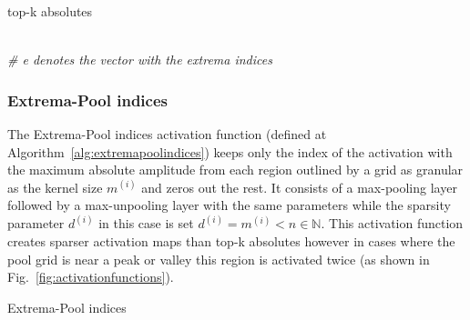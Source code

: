\documentclass[journal]{IEEEtran}
\begin{document}
\begin{algorithm}[H]
	\caption{top-k absolutes}\label{alg:topkabsolutes}
	\begin{algorithmic}[1]
		\renewcommand{\algorithmicrequire}{\textbf{Input:}}
		\renewcommand{\algorithmicensure}{\textbf{Output:}}
		\ENSURE{$\alpha$}
		\\\textit{\scriptsize \# e denotes the vector with the extrema indices}
		\ENDFOR{}
		\RETURN{$\alpha$}
	\end{algorithmic}
\end{algorithm}

\subsubsection{Extrema-Pool indices}\label{sec:extremapoolindices}
The Extrema-Pool indices activation function (defined at Algorithm~\ref{alg:extremapoolindices}) keeps only the index of the activation with the maximum absolute amplitude from each region outlined by a grid as granular as the kernel size $m^{(i)}$ and zeros out the rest.
It consists of a max-pooling layer followed by a max-unpooling layer with the same parameters while the sparsity parameter $d^{(i)}$ in this case is set $d^{(i)} = m^{(i)} < n \in \mathbb{N}$.
This activation function creates sparser activation maps than top-k absolutes however in cases where the pool grid is near a peak or valley this region is activated twice (as shown in Fig.~\ref{fig:activationfunctions}).

\begin{algorithm}[H]
	\caption{Extrema-Pool indices}\label{alg:extremapoolindices}
	\begin{algorithmic}[1]
		\renewcommand{\algorithmicrequire}{\textbf{Input:}}
		\renewcommand{\algorithmicensure}{\textbf{Output:}}
		\ENSURE{$\alpha$}
		\RETURN{$\alpha$}
	\end{algorithmic}
\end{algorithm}
\end{document}
